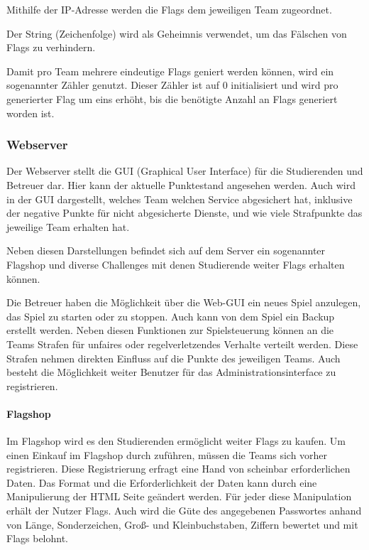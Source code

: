 Mithilfe der IP-Adresse werden die Flags dem jeweiligen Team zugeordnet.

Der String (Zeichenfolge)  wird als Geheimnis verwendet, um das Fälschen von Flags zu verhindern.

Damit pro Team mehrere eindeutige Flags geniert werden können, wird ein sogenannter Zähler genutzt. Dieser Zähler ist auf 0 initialisiert und wird pro generierter Flag um eins erhöht, bis die benötigte Anzahl an Flags generiert worden ist.\cite[S.48]{sosnaKonzeptionUndRealisierung2010}

\subsubsection{Webserver}\label{subsubsec:Webserver}

Der Webserver stellt die GUI (Graphical User Interface) für die Studierenden und Betreuer dar. Hier kann der aktuelle Punktestand angesehen werden. Auch wird in der GUI dargestellt, welches Team welchen Service abgesichert hat, inklusive der negative Punkte für nicht abgesicherte Dienste, und wie viele Strafpunkte das jeweilige Team erhalten hat.

Neben diesen Darstellungen befindet sich auf dem Server ein sogenannter Flagshop und diverse Challenges mit denen Studierende weiter Flags erhalten können.

Die Betreuer haben die Möglichkeit über die Web-GUI ein neues Spiel anzulegen, das Spiel zu starten oder zu stoppen. Auch kann von dem Spiel ein Backup erstellt werden. Neben diesen Funktionen zur Spielsteuerung können an die Teams Strafen für unfaires oder regelverletzendes Verhalte verteilt werden. Diese Strafen nehmen direkten Einfluss auf die Punkte des jeweiligen Teams. Auch besteht die Möglichkeit weiter Benutzer für das Administrationsinterface zu registrieren.

\paragraph{Flagshop} \label{para:Flagshop}
Im Flagshop wird es den Studierenden ermöglicht weiter Flags zu kaufen. Um einen Einkauf im Flagshop durch zuführen, müssen die Teams sich vorher registrieren. Diese Registrierung erfragt eine Hand von scheinbar erforderlichen Daten. Das Format und die Erforderlichkeit der Daten kann durch eine Manipulierung der HTML Seite geändert werden. Für jeder diese Manipulation erhält der Nutzer Flags. Auch wird die Güte des angegebenen Passwortes anhand von Länge, Sonderzeichen, Groß- und Kleinbuchstaben, Ziffern bewertet und mit Flags belohnt.

